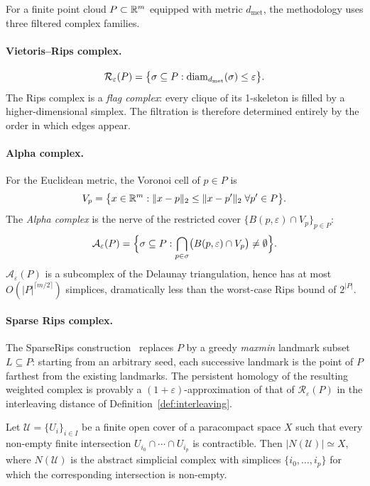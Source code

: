 For a finite point cloud $P\subset\mathbb{R}^m$ equipped with metric $d_{\mathrm{met}}$, the methodology uses three filtered complex families.

\paragraph{Vietoris--Rips complex.}
\begin{equation}
  \mathcal{R}_\varepsilon(P)=\bigl\{\sigma\subseteq P:\operatorname{diam}_{d_{\mathrm{met}}}(\sigma)\leq\varepsilon\bigr\}.
  \label{eq:rips}
\end{equation}
The Rips complex is a \emph{flag complex}: every clique of its 1-skeleton is filled by a higher-dimensional simplex. The filtration is therefore determined entirely by the order in which edges appear.

\paragraph{Alpha complex.}
For the Euclidean metric, the Voronoi cell of $p\in P$ is
\[
  V_p=\bigl\{x\in\mathbb{R}^m:\|x-p\|_2\leq\|x-p'\|_2\;\forall p'\in P\bigr\}.
\]
The \emph{Alpha complex} is the nerve of the restricted cover $\{B(p,\varepsilon)\cap V_p\}_{p\in P}$:
\begin{equation}
  \mathcal{A}_\varepsilon(P)=\Bigl\{\sigma\subseteq P:\bigcap_{p\in\sigma}\bigl(B(p,\varepsilon)\cap V_p\bigr)\neq\emptyset\Bigr\}.
  \label{eq:alpha}
\end{equation}
$\mathcal{A}_\varepsilon(P)$ is a subcomplex of the Delaunay triangulation, hence has at most $O(|P|^{\lceil m/2\rceil})$ simplices, dramatically less than the worst-case Rips bound of $2^{|P|}$.

\paragraph{Sparse Rips complex.}
The SparseRips construction~\parencite{cavanna2015geometric} replaces $P$ by a greedy \emph{maxmin} landmark subset $L\subseteq P$: starting from an arbitrary seed, each successive landmark is the point of $P$ farthest from the existing landmarks. The persistent homology of the resulting weighted complex is provably a $(1+\varepsilon)$-approximation of that of $\mathcal{R}_\varepsilon(P)$ in the interleaving distance of Definition~\ref{def:interleaving}.

\begin{theorem}
\label{thm:nerve}
Let $\mathcal{U}=\{U_i\}_{i\in I}$ be a finite open cover of a paracompact space $X$ such that every non-empty finite intersection $U_{i_0}\cap\cdots\cap U_{i_p}$ is contractible. Then $|N(\mathcal{U})|\simeq X$, where $N(\mathcal{U})$ is the abstract simplicial complex with simplices $\{i_0,\ldots,i_p\}$ for which the corresponding intersection is non-empty.
\end{theorem}

